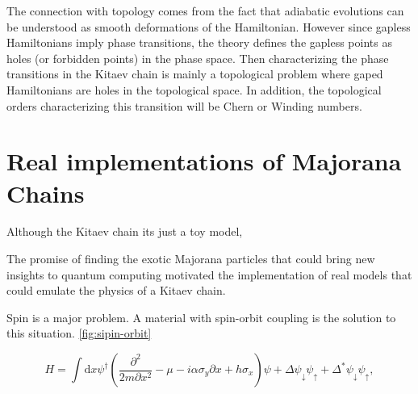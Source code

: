 The connection with topology comes from the fact that adiabatic evolutions can be understood as smooth deformations of the Hamiltonian. However since gapless Hamiltonians imply phase transitions, the theory defines the gapless points as holes (or forbidden points) in the phase space. Then characterizing the phase transitions in the Kitaev chain is mainly a topological problem where gaped Hamiltonians are holes in the topological space. In addition, the topological orders characterizing this transition will be Chern or Winding numbers. \\










% 
% 
\section{Real implementations of Majorana Chains \label{sec:exp}} 

Although the Kitaev chain its just a toy model, 

The promise of finding the exotic Majorana particles that could bring new insights to quantum computing motivated the implementation of real models that could emulate the physics of a Kitaev chain. 

Spin is a major problem. A material with spin-orbit coupling is  the solution to this situation. \ref{fig:sipin-orbit} 

\begin{equation}
    H =\int\mbox{d}x\psi^{\dagger}\left(\frac{\partial^{2}}{2m\partial x^{2}}-\mu -i\alpha\sigma_{y}\partial x+h\sigma_{x}\right)\psi+\Delta\psi_{\downarrow}\psi_{\uparrow}+\Delta^{*}\psi_{\downarrow}\psi_{\uparrow},
    \label{eq:MajoranaChainHam}
\end{equation}




